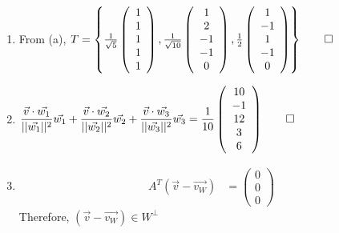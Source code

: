 \documentclass[12pt, a4paper]{article}
\begin{document}
\begin{enumerate}[Q\arabic*.]
\begin{enumerate}[(\alph*)]
      \item From (a), $T = \left\{\frac{1}{\sqrt{5}}\left(\begin{array}{c} 1\\ 1\\ 1\\ 1\\ 1 \end{array}\right), \frac{1}{\sqrt{10}}\left(\begin{array}{c} 1\\ 2\\ -1\\ -1\\ 0 \end{array}\right), \frac{1}{2}\left(\begin{array}{c} 1\\ -1\\ 1\\ -1\\ 0 \end{array}\right)\right\} \qed$

      \item $\displaystyle \frac{\vec{v}\cdot \vec{w_1}}{||\vec{w_1}||^2}\vec{w_1} + \frac{\vec{v}\cdot \vec{w_2}}{||\vec{w_2}||^2}\vec{w_2} + \frac{\vec{v}\cdot \vec{w_3}}{||\vec{w_3}||^2}\vec{w_3} = \frac{1}{10}\left(\begin{array}{c} 10\\ -1\\ 12\\ 3\\ 6 \end{array}\right) \qed$ 

      \item 
        \begin{align*}
          A^T(\vec{v} - \vec{v_W}) &= \left(\begin{array}{c} 0\\ 0\\ 0 \end{array}\right)
        \end{align*}
        Therefore, $(\vec{v} - \vec{v_W}) \in W^{\perp}$
    \end{enumerate}


\end{enumerate}
\end{document}
